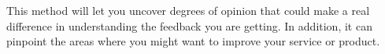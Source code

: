 This method will let you uncover degrees of opinion that could make a real difference in understanding the feedback you are getting. In addition, it can pinpoint the areas where you might want to improve your service or product. \cite{likertScale} \\





\begin{comment}\section{Design}\label{designMethod}
To come up with a design that can be implemented in a prototype that should be able to answer the final problem statement (see \autoref{sec:FPS}), multiple idea generation phases had to be conducted. As a part of these phases, an ideation workshop was run in collaboration with children from a Sankt Annæ 4th grade class (see \autoref{sec:workshop}).\\\\
some design proposals based on the aforementioned feedback will be created, and analyzed using a method akin to the Crawford slip method\cite{crawfordSlip}. To do this a lay out of the drawn ideas will be placed on a table, and every group member will write down what they think are positive and relevant elements of each idea on slips of paper. These slips will then be analyzed and be used to define the next iteration of our design.

\subsection{Usability}
The first usability test was conducted during the workshop with the children at Skt. Annæ school in the form of an early paper prototype. The feedback provided was brought back and used to create the next iteration of the prototype. \\
The next iteration was created without contact to the users due to not having the time and resources available. This iteration would be implemented and made ready for the initial usability test which will be conducted on Aalborg university Copenhagen.
The usability test will be in a controlled setting using the system usability scale (SUS) method, observation method and a think aloud test. The goal is to find out how the users perform on typical tasks, that are designed for them (the target group). 
The usability test will first conduct information from observation and a think aloud test. There will be 1-2 observers and the whole interaction should be exploratory for the tester. \end{comment}
	
